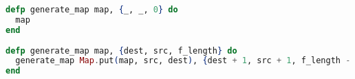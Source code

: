 \begin{lstlisting}[language=Elixir, caption=Generating maps]
defp generate_map map, {_, _, 0} do
  map
end
  
defp generate_map map, {dest, src, f_length} do
  generate_map Map.put(map, src, dest), {dest + 1, src + 1, f_length - 1}
end
\end{lstlisting}